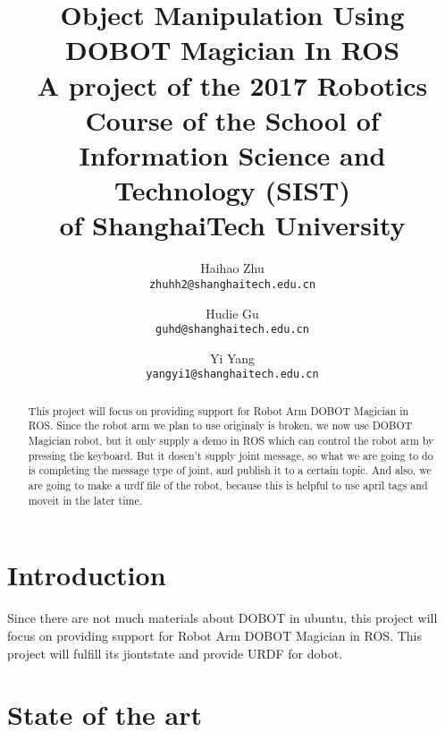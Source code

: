 \documentclass[10pt,twocolumn,letterpaper]{article}
\begin{document}
\title{
Object Manipulation Using DOBOT Magician In ROS \\
\bigskip
\large A project of the	2017 Robotics Course of	the	School of \\
Information Science and Technology (SIST) \\
of ShanghaiTech University}


\author{Haihao Zhu\\
{\tt\small zhuhh2@shanghaitech.edu.cn}
\and
Hudie Gu\\
{\tt\small guhd@shanghaitech.edu.cn}
\and
Yi Yang\\
{\tt\small yangyi1@shanghaitech.edu.cn}
}
\maketitle

\begin{abstract}
   This project will focus on providing support for Robot Arm DOBOT Magician in ROS. Since the robot arm we plan to use originaly is broken, we now use DOBOT Magician robot, but it only supply a demo in ROS which can control the robot arm by pressing the keyboard. But it dosen't supply joint message, so what we are going to do is completing the message type of joint, and publish it to a certain topic. And also, we are going to make a urdf file of the robot, because this is helpful to use april tags and moveit in the later time.
\end{abstract}

\section{Introduction}

Since there are not much materials about DOBOT in ubuntu, this project will focus on providing support for Robot Arm DOBOT Magician in ROS. This project will fulfill its jiontstate and provide URDF for dobot. 

\section{State of the art}
\end{document}
